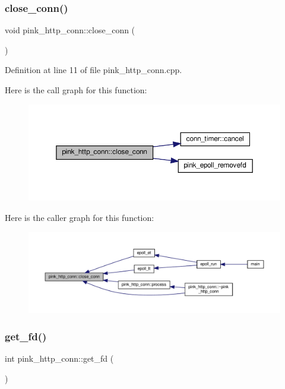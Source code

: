 \subsubsection{\texorpdfstring{close\+\_\+conn()}{close\_conn()}}
{\footnotesize\ttfamily void pink\+\_\+http\+\_\+conn\+::close\+\_\+conn (\begin{DoxyParamCaption}{ }\end{DoxyParamCaption})}



Definition at line 11 of file pink\+\_\+http\+\_\+conn.\+cpp.

Here is the call graph for this function\+:
\nopagebreak
\begin{figure}[H]
\begin{center}
\leavevmode
\includegraphics[width=350pt]{classpink__http__conn_abdcd7c0da8072d62cb7212523f20298b_cgraph}
\end{center}
\end{figure}
Here is the caller graph for this function\+:
\nopagebreak
\begin{figure}[H]
\begin{center}
\leavevmode
\includegraphics[width=350pt]{classpink__http__conn_abdcd7c0da8072d62cb7212523f20298b_icgraph}
\end{center}
\end{figure}
\mbox{\label{classpink__http__conn_aa304899ec9a7f6d7a2a9d738309a9570}} 
\subsubsection{\texorpdfstring{get\+\_\+fd()}{get\_fd()}}
{\footnotesize\ttfamily int pink\+\_\+http\+\_\+conn\+::get\+\_\+fd (\begin{DoxyParamCaption}{ }\end{DoxyParamCaption})}



